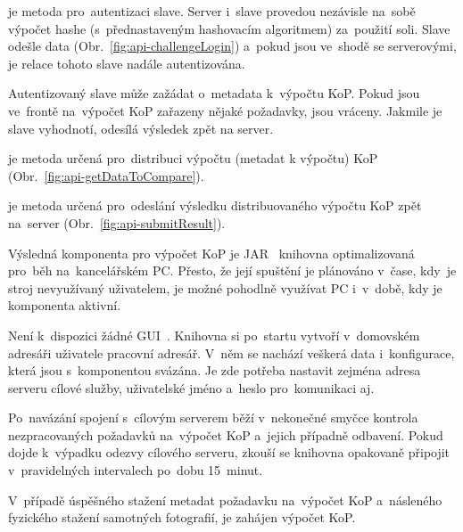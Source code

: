 
 je metoda pro~autentizaci slave. Server i~slave provedou nezávisle na~sobě výpočet hashe (s~přednastaveným hashovacím algoritmem) za~použití soli. Slave odešle data (Obr.~\ref{fig:api-challengeLogin}) a~pokud jsou ve~shodě se serverovými, je relace tohoto slave nadále autentizována.


Autentizovaný slave může zažádat o~metadata k~výpočtu KoP. Pokud jsou ve~frontě na~výpočet KoP zařazeny nějaké požadavky, jsou vráceny. Jakmile je slave vyhodnotí, odesílá výsledek zpět na server.

je metoda určená pro~distribuci výpočtu (metadat k výpočtu) KoP (Obr.~\ref{fig:api-getDataToCompare}).


je metoda určená pro~odeslání výsledku distribuovaného výpočtu KoP zpět na~server (Obr.~\ref{fig:api-submitResult}).





Výsledná komponenta pro výpočet KoP je JAR~\cite{jar} knihovna optimalizovaná pro~běh na~kancelářském PC. Přesto, že její spuštění je plánováno v~čase, kdy~je stroj nevyužívaný uživatelem, je možné pohodlně využívat PC i~v~době, kdy je komponenta aktivní.

Není k~dispozici žádné GUI~\cite{gui}. Knihovna si po~startu vytvoří v~domovském adresáři uživatele pracovní adresář. V~něm se nachází veškerá data i~konfigurace, která jsou s~komponentou svázána. Je zde potřeba nastavit zejména adresa serveru cílové služby, uživatelské jméno a~heslo pro~komunikaci aj.

Po~navázání spojení s~cílovým serverem běží v~nekonečné smyčce kontrola nezpracovaných požadavků na~výpočet KoP a~jejich případně odbavení. Pokud dojde k~výpadku odezvy cílového serveru, zkouší se knihovna opakovaně připojit v~pravidelných intervalech po~dobu 15~minut.

V~případě úspěšného stažení metadat požadavku na~výpočet KoP a~násleného fyzického stažení samotných fotografií, je zahájen výpočet KoP.


